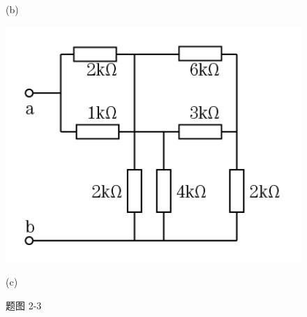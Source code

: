 \documentclass[hyperref, UTF8]{ctexart}
\begin{document}
\begin{figure}[!htb]
\begin{minipage}[t]{0.217\textwidth}
    \caption*{(b)}
  \end{minipage}
  \begin{minipage}[t]{0.270\textwidth}
    \centering
    \includegraphics[width=1\textwidth]{p2-3-c.png}
    \caption*{(c)}
  \end{minipage}
  \caption*{题图 2-3}
\end{figure}
\end{document}
